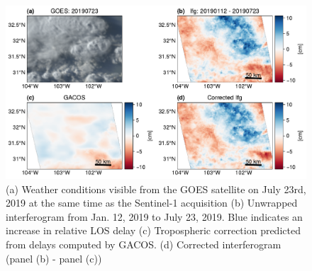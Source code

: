 \begin{figure}
	\centering
	\includegraphics[width=1.0\textwidth]{figures/chapter2-sar/figure_tropo_correct_gacos_storm.pdf}	
	\caption[West Texas tropospheric correction attempt for thunderstorm]{
		(a) Weather conditions visible from the GOES satellite on July 23rd, 2019 at the same time as the Sentinel-1 acquisition
		(b) Unwrapped interferogram from Jan. 12, 2019 to July 23, 2019. Blue indicates an increase in relative LOS delay
		(c) Tropospheric correction predicted from delays computed by GACOS.
		(d) Corrected interferogram (panel (b) - panel (c))
	}
	\label{fig:ch2-tropo-correct-storm}
\end{figure}



